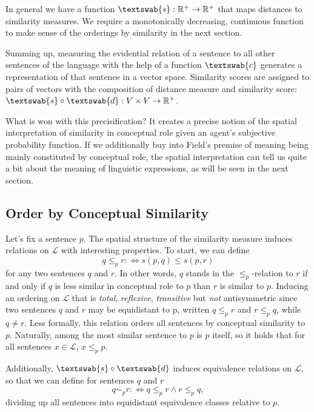 \documentclass[11pt, a4paper]{scrartcl}
\renewcommand{\i}[1]{\emph{#1}}
\renewcommand{\L}{\mathcal{L}}
\newcommand{\m}[1]{\textswab{#1}}
\begin{document}
In general we have a function ${\m{s}: \mathbb{R}^+ \rightarrow \mathbb{R}^+ }$ that maps distances to similarity measures. We require a monotonically decreasing, continuous function to make sense of the orderings by similarity in the next section. 

Summing up, measuring the evidential relation of a sentence to all other sentences of the language with the help of a function $\m{c}$ generates a representation of that sentence in a vector space. Similarity scores are assigned to pairs of vectors with the composition of distance measure and similarity score: ${\m{s}\circ \m{d} : V \times V \rightarrow \mathbb{R}^+}$.

What is won with this precisification? It creates a precise notion of the spatial interpretation of similarity in conceptual role given an agent's subjective probability function. If we additionally buy into Field's premise of meaning being mainly constituted by conceptual role, the spatial interpretation can tell us quite a bit about the meaning of linguistic expressions, as will be seen in the next section.

\subsection{Order by Conceptual Similarity}\label{sec:order}

Let's fix a sentence $p$. The spatial structure of the similarity measure induces relations on $\L$ with interesting properties. To start, we can define 
\[
    q \leqslant_p r :\Leftrightarrow s(p,q) \leqslant s(p,r)
\]
for any two sentences $q$ and $r$. In other words, $q$ stands in the $\leqslant_p$-relation to $r$ if and only if $q$ is less similar in conceptual role to $p$ than $r$ is similar to $p$. Inducing an ordering on $\L$ that is \i{total}, \i{reflexive}, \i{transitive} but \i{not} antisymmetric since two sentences $q$ and $r$ may be equidistant to p, written $q \leqslant_p r$ and $r \leqslant_p q$, while $q \not = r$. Less formally, this relation orders all sentences by conceptual similarity to $p$. Naturally, among the most similar sentence to $p$ is $p$ itself, so it holds that for all sentences ${x \in \L}$, ${x\leqslant_p p}$.

Additionally, $\m{s}\circ \m{d}$ induces equivalence relations on $\L$, so that we can define for sentences $q$ and $r$ 
\[
    q \sim_p r :\Leftrightarrow q \leqslant_p r \land r \leqslant_p q,
\]
dividing up all sentences into equidistant equivalence classes relative to $p$.
\end{document}
